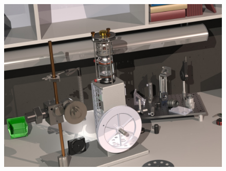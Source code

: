 \documentclass[12pt,a4paper]{article}
\begin{document}
\begin{figure}[H]
	\centering
	\includegraphics[scale=2]{./data/3D-Model/PS9-model_desk01.JPG}
	\label{fig:stirlingMotor_3D-desktop}
\end{figure}
\end{document}
